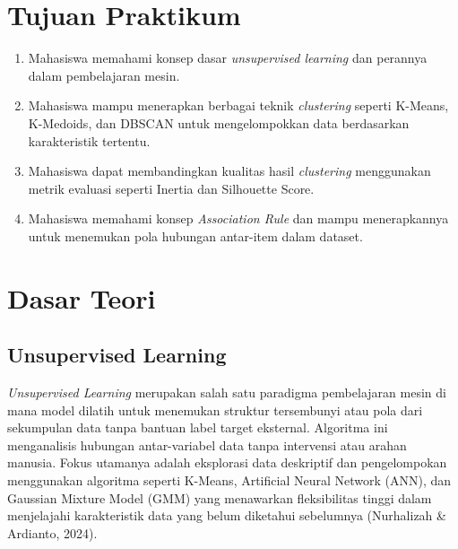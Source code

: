 \documentclass[a4paper,oneside,12pt]{report}
\begin{document}
\tableofcontents
\clearpage

\setcounter{page}{3}

\chapter[Tujuan Praktikum]{Tujuan Praktikum}

\begin{enumerate}
    \item Mahasiswa memahami konsep dasar \textit{unsupervised learning} dan perannya dalam pembelajaran mesin.
    \item Mahasiswa mampu menerapkan berbagai teknik \textit{clustering} seperti K-Means, K-Medoids, dan DBSCAN untuk mengelompokkan data berdasarkan karakteristik tertentu.
    \item Mahasiswa dapat membandingkan kualitas hasil \textit{clustering} menggunakan metrik evaluasi seperti Inertia dan Silhouette Score.
    \item Mahasiswa memahami konsep \textit{Association Rule} dan mampu menerapkannya untuk menemukan pola hubungan antar-item dalam dataset.
\end{enumerate}
\clearpage

\chapter[Dasar Teori]{Dasar Teori}

\section{Unsupervised Learning}
\textit{Unsupervised Learning} merupakan salah satu paradigma pembelajaran mesin di mana model dilatih untuk menemukan struktur tersembunyi atau pola dari sekumpulan data tanpa bantuan label target eksternal. Algoritma ini menganalisis hubungan antar-variabel data tanpa intervensi atau arahan manusia. Fokus utamanya adalah eksplorasi data deskriptif dan pengelompokan menggunakan algoritma seperti K-Means, Artificial Neural Network (ANN), dan Gaussian Mixture Model (GMM) yang menawarkan fleksibilitas tinggi dalam menjelajahi karakteristik data yang belum diketahui sebelumnya (Nurhalizah \& Ardianto, 2024).
\end{document}
